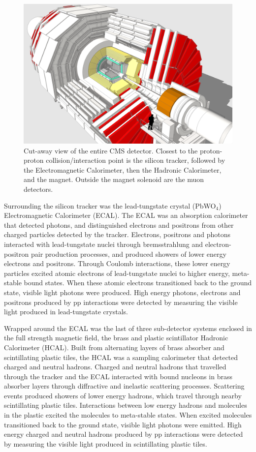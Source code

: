 \begin{figure}[h]
	\centering
	\includegraphics[width=1\textwidth]{figures/cmsDetectorBasic.png}
	\caption{Cut-away view of the entire CMS detector.  Closest to the proton-proton collision/interaction point is the 
		silicon tracker, followed by the Electromagnetic Calorimeter, then the Hadronic Calorimeter, and the 
	magnet.  Outside the magnet solenoid are the muon detectors.}
	\label{fig:layersOfCMS}
\end{figure}


Surrounding the silicon tracker was the lead-tungstate crystal (PbWO$_{4}$) Electromagnetic Calorimeter (ECAL).  
The ECAL was an absorption calorimeter that detected photons, and distinguished electrons and positrons from other charged 
particles detected by the tracker.  Electrons, positrons and photons interacted with lead-tungstate nuclei 
through bremsstrahlung and electron-positron pair production processes, and produced showers of lower energy
electrons and positrons.  Through Coulomb interactions, these lower energy particles excited atomic electrons
of lead-tungstate nuclei to higher energy, meta-stable bound states.  When these atomic electrons transitioned
back to the ground state, visible light photons were produced.  High energy photons, electrons and positrons 
produced by pp interactions were detected by measuring the visible light produced in lead-tungstate crystals.

Wrapped around the ECAL was the last of three sub-detector systems enclosed in the full strength magnetic field, the brass and 
plastic scintillator Hadronic Calorimeter (HCAL).  Built from alternating layers of brass absorber and scintillating
plastic tiles, the HCAL was a sampling calorimeter that detected charged and neutral hadrons.  Charged and 
neutral hadrons that travelled through the tracker and the ECAL interacted with bound nucleons in brass absorber layers
through diffractive and inelastic scattering processes.  Scattering events produced showers of lower energy hadrons, which
travel through nearby scintillating plastic tiles.  Interactions between low energy hadrons and molecules in
the plastic excited the molecules to meta-stable states.  When excited molecules transitioned back to the ground 
state, visible light photons were emitted.  High energy charged and neutral hadrons produced by pp interactions 
were detected by measuring the visible light produced in scintillating plastic tiles.

